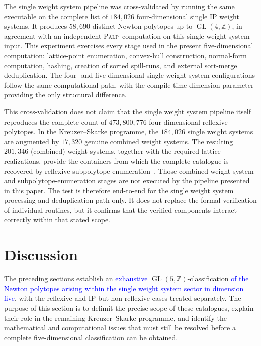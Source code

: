 \documentclass[appliedmath,article,submit,moreauthors]{Definitions/mdpi}
\newcommand{\Z}{\mathbb{Z}}
\newcommand{\GL}{\operatorname{GL}}
\newcommand{\PALP}{\textsc{Palp}}
\begin{document}
{\color{blue}
The single weight system pipeline was cross-validated by running the same
executable on the complete list of \(184{,}026\) four-dimensional single IP
weight systems. It produces \(58{,}690\) distinct Newton polytopes up to
\(\GL(4,\Z)\), in agreement with an independent \PALP\ computation on this
single weight system input. This experiment exercises every stage used in the
present five-dimensional computation: lattice-point enumeration, convex-hull
construction, normal-form computation, hashing, creation of sorted spill-runs,
and external sort-merge deduplication. The four- and five-dimensional
single weight system configurations follow the same computational path, with
the compile-time dimension parameter providing the only structural difference.

This cross-validation does not claim that the single weight system pipeline
itself reproduces the complete count of \(473{,}800{,}776\)
four-dimensional reflexive polytopes. In the Kreuzer--Skarke programme, the
\(184{,}026\) single weight systems are augmented by \(17{,}320\) genuine
combined weight systems. The resulting \(201{,}346\) (combined) weight systems,
together with the required lattice realizations, provide the containers from
which the complete catalogue is recovered by reflexive-subpolytope
enumeration~\cite{KreuzerSkarke2000,KSFibrations2002,KreuzerCYData}. Those
combined weight system and subpolytope-enumeration stages are not executed by
the pipeline presented in this paper. The test is therefore end-to-end for the
single weight system processing and deduplication path only. It does not replace
the formal verification of individual routines, but it confirms that the
verified components interact correctly within that stated scope.
}


\section{Discussion}
\label{sec:discussion}

The preceding sections establish an \textcolor{blue}{exhaustive}
\(\GL(5,\Z)\)-classification \textcolor{blue}{of the Newton polytopes arising
within the single weight system sector in dimension five}, with the
reflexive and IP but non-reflexive cases treated separately. The purpose of this
section is to delimit the precise scope of these catalogues, explain their role
in the remaining Kreuzer--Skarke programme, and identify the mathematical and
computational issues that must still be resolved before a complete
five-dimensional classification can be obtained.
\end{document}
